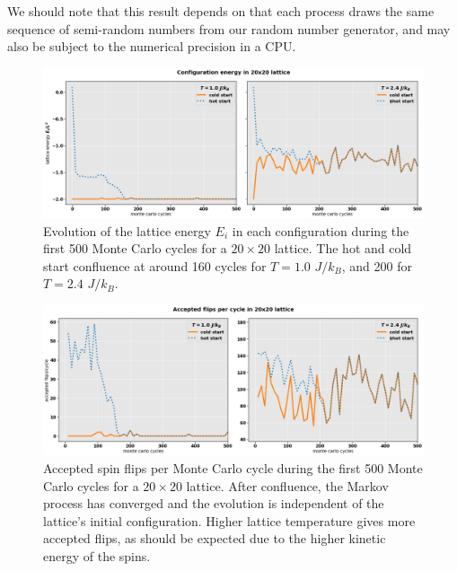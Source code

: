 \documentclass[]{article}
\begin{document}
We should note that this result depends on that each process draws the same sequence of semi-random numbers from our random number generator, and may also be subject to the numerical precision in a CPU.

\begin{figure}[!h]
	\centering
	\includegraphics[width=1\linewidth]{./figs/20x20-config-energy.png}
	\caption{Evolution of the lattice energy $E_i$ in each configuration during the first 500 Monte Carlo cycles for a $20 \times 20$ lattice. The hot and cold start confluence at around 160 cycles for $T = 1.0$ $J/k_B$, and 200 for $T = 2.4$ $J/k_B$.}
	\label{fig:20x20-config-energy}
\end{figure}

\begin{figure}[!h]
	\centering
	\includegraphics[width=1\linewidth]{./figs/20x20-flips-per-cycle.png}
	\caption{Accepted spin flips per Monte Carlo cycle during the first 500 Monte Carlo cycles for a $20 \times 20$ lattice. After confluence, the Markov process has converged and the evolution is independent of the lattice's initial configuration. Higher lattice temperature gives more accepted flips, as should be expected due to the higher kinetic energy of the spins.}
	\label{fig:20x20-flips-per-cycle}
\end{figure}
\end{document}

